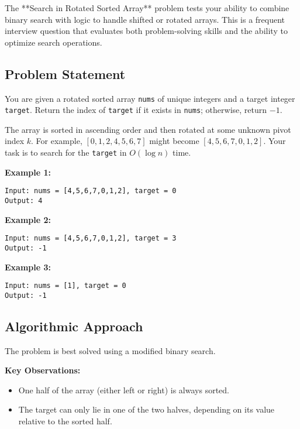 
\label{problem:Search_in_Rotated_Sorted_Array}

The **Search in Rotated Sorted Array** problem tests your ability to combine binary search with logic to handle shifted or rotated arrays. This is a frequent interview question that evaluates both problem-solving skills and the ability to optimize search operations.

\subsection*{Problem Statement}
You are given a rotated sorted array \texttt{nums} of unique integers and a target integer \texttt{target}. Return the index of \texttt{target} if it exists in \texttt{nums}; otherwise, return \(-1\).

The array is sorted in ascending order and then rotated at some unknown pivot index \(k\). For example, \([0, 1, 2, 4, 5, 6, 7]\) might become \([4, 5, 6, 7, 0, 1, 2]\). Your task is to search for the \texttt{target} in \(O(\log n)\) time.

\textbf{Example 1:}
\begin{verbatim}
Input: nums = [4,5,6,7,0,1,2], target = 0
Output: 4
\end{verbatim}

\textbf{Example 2:}
\begin{verbatim}
Input: nums = [4,5,6,7,0,1,2], target = 3
Output: -1
\end{verbatim}

\textbf{Example 3:}
\begin{verbatim}
Input: nums = [1], target = 0
Output: -1
\end{verbatim}

\subsection*{Algorithmic Approach}
The problem is best solved using a modified binary search.

\textbf{Key Observations:}
\begin{itemize}
    \item One half of the array (either left or right) is always sorted.
    \item The target can only lie in one of the two halves, depending on its value relative to the sorted half.
\end{itemize}

